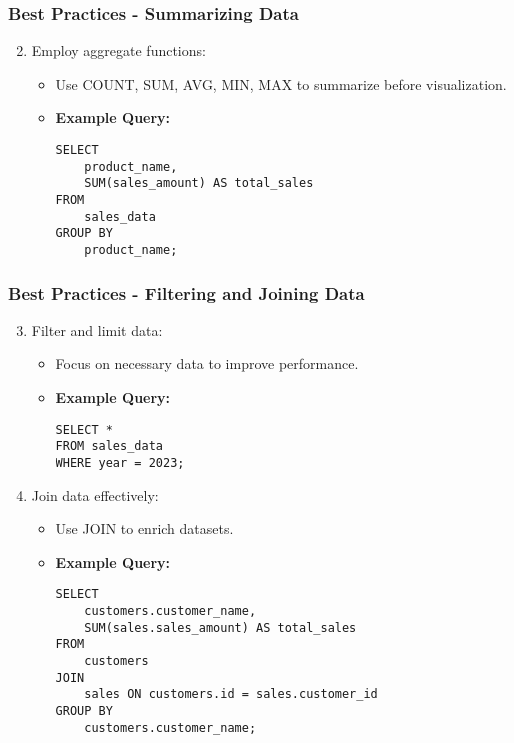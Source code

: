 \documentclass{beamer}
\begin{document}
\begin{frame}[fragile]
    \frametitle{Best Practices - Summarizing Data}
    \begin{enumerate}
        \setcounter{enumi}{1}
        \item Employ aggregate functions:
        \begin{itemize}
            \item Use COUNT, SUM, AVG, MIN, MAX to summarize before visualization.
            \item \textbf{Example Query:}
            \begin{lstlisting}
SELECT 
    product_name, 
    SUM(sales_amount) AS total_sales
FROM 
    sales_data
GROUP BY 
    product_name;
            \end{lstlisting}
        \end{itemize}
    \end{enumerate}
\end{frame}

\begin{frame}[fragile]
    \frametitle{Best Practices - Filtering and Joining Data}
    \begin{enumerate}
        \setcounter{enumi}{2}
        \item Filter and limit data:
        \begin{itemize}
            \item Focus on necessary data to improve performance.
            \item \textbf{Example Query:}
            \begin{lstlisting}
SELECT * 
FROM sales_data 
WHERE year = 2023;
            \end{lstlisting}
        \end{itemize}
        
        \item Join data effectively:
        \begin{itemize}
            \item Use JOIN to enrich datasets.
            \item \textbf{Example Query:}
            \begin{lstlisting}
SELECT 
    customers.customer_name, 
    SUM(sales.sales_amount) AS total_sales
FROM 
    customers
JOIN 
    sales ON customers.id = sales.customer_id
GROUP BY 
    customers.customer_name;
            \end{lstlisting}
        \end{itemize}
    \end{enumerate}
\end{frame}
\end{document}
